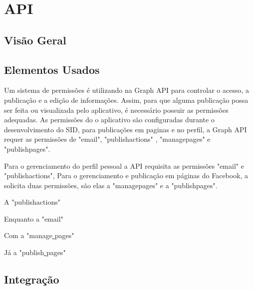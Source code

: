 \chapter[API]{API}
\section{Visão Geral}
\section{Elementos Usados}
Um sistema de permissões é utilizando na Graph API para controlar o acesso, a publicação e a edição de informações. Assim, para que alguma publicação possa ser feita ou visualizada pelo aplicativo, é necessário possuir as permissões adequadas. As permissões do o aplicativo são configuradas durante o desenvolvimento do SID, para publicações em paginas e no perfil, a Graph API requer as permissões de  "email", "publish\textunderscore{}actions" , "manage\textunderscore{}pages"  e "publish\textunderscore{}pages".

Para o gerenciamento do perfil pessoal a API requisita as permissões  "email" e "publish\textunderscore{}actions",  Para o gerenciamento e publicação em páginas  do Facebook, a solicita duas permissões, são elas a "manage\textunderscore{}pages" e a "publish\textunderscore{}pages".

A "publish\textunderscore{}actions"

Enquanto a "email"

Com a "manage\underline{{ }}pages"

Já a "publish\underline{{ }}pages"

\section{Integração}
